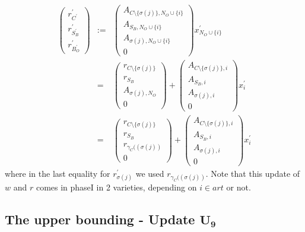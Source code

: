 \documentclass[a4paper]{article}
\begin{document}
\begin{eqnarray}
\left(
\begin{array}{c}
r_{C^{\prime}}^{\prime} \\
\hline
r_{S_{B}^{\prime}}^{\prime} \\
\hline
r_{B_{O}^{\prime}}^{\prime}
\end{array}
\right)
&:=&
\left(
\begin{array}{c}
A_{C \setminus \{\sigma(j)\}, N_{O} \cup \{i\}} \\
\hline
A_{S_{B}, N_{O} \cup \{i\}} \\
\hline
A_{\sigma(j), N_{O} \cup \{i\}} \\
\hline
0
\end{array}
\right)
x_{N_{O} \cup \{i\}}^{\prime}
\nonumber \\
&=&
\left(
\begin{array}{c}
r_{C \setminus \{\sigma(j)\}} \\
\hline
r_{S_{B}} \\
\hline
A_{\sigma(j), N_{O}} \\
\hline
0
\end{array}
\right)
+
\left(
\begin{array}{c}
A_{C \setminus \{\sigma(j)\}, i} \\
\hline
A_{S_{B}, i} \\
\hline
A_{\sigma(j), i} \\
\hline
0
\end{array}
\right)
x_{i}^{\prime}
\nonumber \\
&=&
\left(
\begin{array}{c}
r_{C \setminus \{\sigma(j)\}} \\
\hline
r_{S_{B}} \\
\hline
r_{\gamma_{C}((\sigma(j))} \\
\hline
0
\end{array}
\right)
+
\left(
\begin{array}{c}
A_{C \setminus \{\sigma(j)\}, i} \\
\hline
A_{S_{B}, i} \\
\hline
A_{\sigma(j), i} \\
\hline
0
\end{array}
\right)
x_{i}^{\prime}
\end{eqnarray}
where in the last equality for $r_{\sigma(j)}^{\prime}$ we used
$r_{\gamma_{C}((\sigma(j))}$. Note that this update of $w$ and $r$ comes in
phaseI in 2 varieties, depending on $i \in art$ or not.

\subsection{The upper bounding - Update $\mathbf{U_{9}}$}
\end{document}
